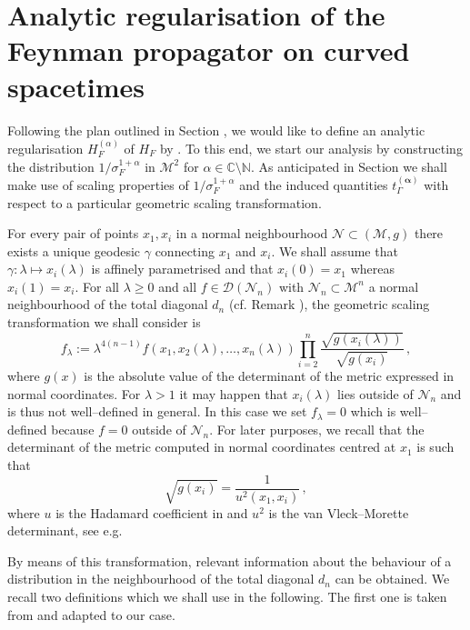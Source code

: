 \documentclass[10pt]{book}
\newcommand{\Dcal}{\mathcal{D}}
\newcommand{\Mcal}{\mathcal{M}}
\newcommand{\Ncal}{\mathcal{N}}
\theoremstyle{break}
\begin{document}
\section{Analytic regularisation of the Feynman propagator on curved spacetimes}


Following the plan outlined in Section %
, we would like to define an analytic regularisation $H^{(\alpha)}_F$ of $H_F$ by %
. To this end, we start our analysis by constructing the distribution $1/\sigma_F^{1+\alpha}$ in $\Mcal^2$ for $\alpha\in \mathbb{C} \setminus \mathbb{N}$. As anticipated in Section %
we shall make use of scaling properties of $1/\sigma_F^{1+\alpha}$ and the induced quantities $t^{(\boldsymbol{\alpha})}_\Gamma$ %
with respect to a particular geometric scaling transformation. 

For every pair of points $x_1,x_i$ in a normal neighbourhood $\Ncal\subset (\Mcal,g)$ there exists a unique geodesic $\gamma$ connecting $x_1$ and $x_i$. We shall assume that $\gamma:\lambda \mapsto x_i(\lambda)$ is affinely parametrised and that $x_i(0) =x_1$ whereas $x_i(1) = x_i$. 
For all $\lambda\ge0$ and all $f\in \Dcal(\Ncal_n)$ with $\Ncal_n\subset \Mcal^n$ a normal neighbourhood of the total diagonal $d_n$ (cf. Remark %
), the geometric scaling transformation we shall consider is
\begin{equation}
f_\lambda := \lambda^{4(n-1)}f(x_1,x_2(\lambda ), \dots, x_n(\lambda))  \prod_{i=2}^n\frac{\sqrt{g(x_i(\lambda ))}}{\sqrt{g(x_i)}}\,,
\end{equation}
where $g(x)$ is the absolute value of the determinant of the metric expressed in normal coordinates. For $\lambda>1$ it may happen that $x_i(\lambda)$ lies outside of $\Ncal_n$ and is thus not well--defined in general. In this case we set $f_\lambda=0$ which is well--defined because $f=0$ outside of $\Ncal_n$. For later purposes, we recall that the determinant of the metric computed in normal coordinates centred at $x_1$ is such that 
\[
\sqrt{g(x_i)} = \frac{1}{u^2(x_1,x_i)}\,,
\]
where $u$ is the Hadamard coefficient in %
and $u^2$ is the van Vleck--Morette determinant, see e.g.  %

By means of this transformation, relevant information about the behaviour of a distribution in the neighbourhood of the total diagonal $d_n$ can be obtained. We recall two definitions which we shall use in the following. The first one is taken from %
and adapted to our case.
\end{document}
